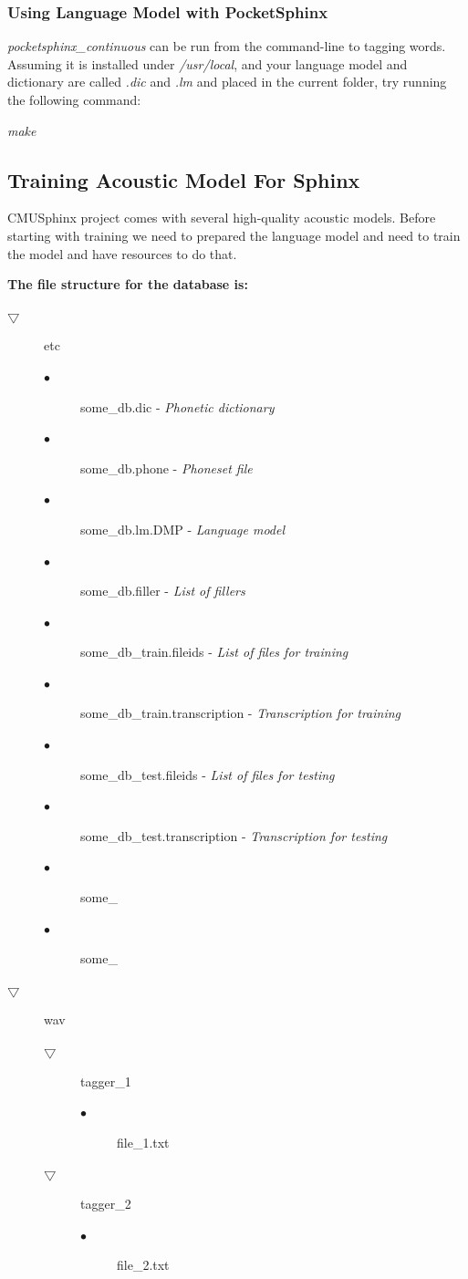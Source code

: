 \documentclass[12pt,a4paper,oneside]{memoir}
\begin{document}
\subsubsection{Using Language Model with PocketSphinx}

\textit{pocketsphinx\_continuous} can be run from the command-line to tagging words. Assuming it is installed under \textit{/usr/local}, and your language model and dictionary are called \textit{.dic} and \textit{.lm} and placed in the current folder, try running the following command: 

\textit{make}


\subsection{Training Acoustic Model For Sphinx}
CMUSphinx project comes with several high-quality acoustic models. Before starting with training we need to prepared the language model and  need to train the model and have resources to do that.


\textbf{The file structure for the database is:} 

\begin{description}
 \item[$\bigtriangledown$] etc
	\begin{description}
		\item[$\bullet$] some\_db.dic - \textit{Phonetic dictionary}
		\item[$\bullet$] some\_db.phone - \textit{Phoneset file}
		\item[$\bullet$] some\_db.lm.DMP - \textit{Language model}
		\item[$\bullet$] some\_db.filler - \textit{List of fillers}
		\item[$\bullet$] some\_db\_train.fileids - \textit{List of files for training}
		\item[$\bullet$] some\_db\_train.transcription - \textit{Transcription for training}
		\item[$\bullet$] some\_db\_test.fileids - \textit{List of files for testing}
		\item[$\bullet$] some\_db\_test.transcription - \textit{Transcription for testing}
		\item[$\bullet$] some\_
		\item[$\bullet$] some\_
	\end{description}
 \item[$\bigtriangledown$] wav
	\begin{description}
		\item[$\bigtriangledown$] tagger\_1
			\begin{description}
				\item[$\bullet$] file\_1.txt  
			\end{description}
		\item[$\bigtriangledown$] tagger\_2
			\begin{description}
				\item[$\bullet$]file\_2.txt
			\end{description}
	\end{description}	
\end{description}
\end{document}
